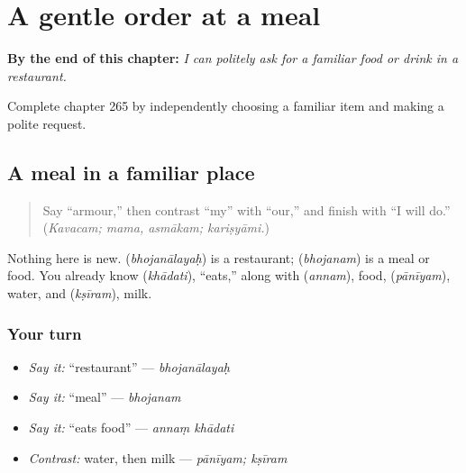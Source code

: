 
\chapter{A gentle order at a meal}
\label{ch:sa-gentle-meal-order}

\begin{chapteropening}
\textbf{By the end of this chapter:} \emph{I can politely ask for a familiar food or drink in a restaurant.}

Complete chapter 265 by independently choosing a familiar item and making a polite request.
\end{chapteropening}

\section[Practice]{A meal in a familiar place}

\label{lesson:SA-C265-meal-and-restaurant-recall}



\begin{quote}
Say “armour,” then contrast “my” with “our,” and finish with “I will do.” (\emph{Kavacam; mama, asmākam; kariṣyāmi.})
\end{quote}

\begin{grammarlens}[title={Grammar Lens: bring the meal words back}]
Nothing here is new. \textbf{} (\emph{bhojanālayaḥ}) is a restaurant; \textbf{} (\emph{bhojanam}) is a meal or food. You already know \textbf{} (\emph{khādati}), “eats,” along with \textbf{} (\emph{annam}), food, \textbf{} (\emph{pānīyam}), water, and \textbf{} (\emph{kṣīram}), milk.
\end{grammarlens}

\subsection*{Your turn}
\begin{itemize}
\raggedright
  \item \emph{Say it:} “restaurant” — \emph{bhojanālayaḥ}
  \item \emph{Say it:} “meal” — \emph{bhojanam}
  \item \emph{Say it:} “eats food” — \emph{annaṃ khādati}
  \item \emph{Contrast:} water, then milk — \emph{pānīyam; kṣīram}
\end{itemize}

